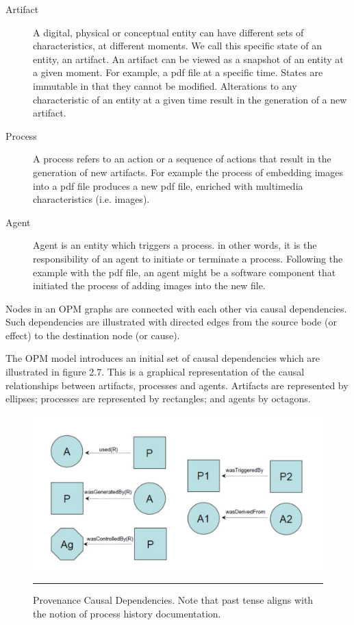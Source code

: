 \begin{description}
  \item[Artifact]
         A digital, physical or conceptual entity can have different sets of characteristics, at different moments. We call this specific state of an entity, an artifact. An artifact can be viewed as a snapshot of an entity at a given moment. For example, a pdf file at a specific time. States are immutable in that they cannot be modified. Alterations to any characteristic of an entity at a given time result in the generation of a new artifact.
  \item[Process]
        A process refers to an action or a sequence of actions that result in the generation of new artifacts. For example the process of embedding images into a pdf file produces a new pdf file, enriched with multimedia characteristics (i.e. images).
  \item[Agent]
        Agent is an entity which triggers a process. in other words, it is the responsibility of an agent to initiate or terminate a process. Following the example with the pdf file, an agent might be a software component that initiated the process of adding images into the new file.
\end{description}

Nodes in an OPM graphs are connected with each other via causal dependencies. Such dependencies are illustrated with directed edges from the source bode (or effect) to the destination node (or cause).

The OPM model introduces an initial set of causal dependencies which are illustrated in figure 2.7. This is a graphical representation of the causal relationships between artifacts, processes and agents. Artifacts are represented by ellipses; processes are represented by rectangles; and agents by octagons.

\begin{figure}[htbp]
	\centering
		\includegraphics[scale=0.60]{./Figures/chapter2/figure7.pdf}
		\rule{35em}{0.5pt}
	\caption[Provenance Causal Dependencies]{Provenance Causal Dependencies\cite{reference13}. Note that past tense aligns with the notion of process history documentation.}
	\label{fig:provCausalDependencies}
\end{figure}


